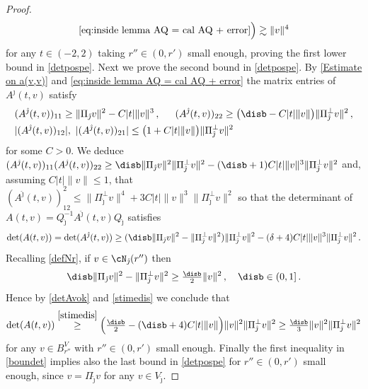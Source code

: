\documentclass[11pt,a4paper,reqno]{article}
\numberwithin{equation}{section}
\theoremstyle{definition}
\begin{document}
\begin{proof}
$${            \eqref{eq:inside lemma AQ = cal AQ + error}
            } \Big)   \gtrsim \|v\|^4 
        $$
     for any $ t \in (-2,2) $ taking $ r'' \in (0,r')$ small enough, proving the first lower bound in \eqref{detpospe}.  Next
     we prove the second bound in \eqref{detpospe}. 
    By \eqref{Estimate on a(v,v)}
    and 
    \eqref{eq:inside lemma AQ = cal AQ + error} the matrix entries of 
$ A^{\hat \jmath}(t,v) $ satisfy
\begin{equation}\label{boundet}
    \begin{aligned}
    &         (A^{\hat \jmath}(t,v))_{11}\geq \|\Pi_{\hat \jmath} v\|^2-C|t|\|v\|^3\, , \quad  \ \,  (A^{\hat \jmath}(t,v))_{22}\geq \big(\disb -C|t|\|v\|\big)\|\Pi_{\hat \jmath}^\bot v\|^2 \, , \\
    & 
| (A^{\hat \jmath}(t,v))_{12}| , \ 
|(A^{\hat \jmath}(t,v))_{21} | \leq  
            \big(1+C|t|\|v\|\big)\|\Pi_{\hat \jmath}^\bot v\|^2 
    \end{aligned}
   \end{equation}
   for some  $C>0$.
   We deduce
$    (A^{\hat \jmath}(t,v))_{11} (A^{\hat \jmath}(t,v))_{22} 
    \geq 
    \disb \|\Pi_{\hat \jmath} v\|^2\|\Pi_{\hat \jmath}^\bot v\|^2-(\disb+1)C|t|\|v\|^3\|\Pi_{\hat \jmath}^\bot v\|^2 $ 
    and, assuming $C|t|\|v\|\leq 1 $, that 
   $ (A^{\hat \jmath}(t,v))_{12}^2
        \leq \|\Pi_{\hat \jmath}^\bot v\|^4+3C|t|\|v\|^3\|\Pi_{\hat \jmath}^\bot v\|^2 $ 
so that  the determinant of 
        $ A(t,v) = 
        Q_{\hat \jmath}^{-1} A^{\hat \jmath}(t,v) Q_{\hat \jmath} 
        $ 
        satisfies 
 \begin{equation}\label{detAvok}
            \det(A(t,v))
             =\det(A^{\hat \jmath}(t,v))\geq (\disb \| \Pi_{\hat \jmath} v\|^2- \|\Pi_{\hat \jmath}^\bot v\|^2)\|\Pi_{\hat \jmath}^\bot v\|^2
            -(\delta+4)C|t|\|v\|^3\|\Pi_{\hat \jmath}^\bot v
            \|^2 \, .
            \end{equation}
    Recalling 
     \eqref{defNr},   
     if $v\in \cN_{\hat \jmath}(r'')$ then
    \begin{equation}\label{stimedis}
        \disb \|\Pi_{\hat \jmath} v\|^2- \|\Pi_{\hat \jmath}^\bot v\|^2\geq \tfrac \disb 2 \|v\|^2 \, , \quad \disb \in (0,1] \, .
     \end{equation}
        Hence by \eqref{detAvok} 
        and \eqref{stimedis} we conclude that 
        $$
            \det(A(t,v))
            \stackrel{ \eqref{stimedis}} \geq 
           \Big(\tfrac\disb 2-(\disb+4)C|t|\|v\|\Big)\|v\|^2\|\Pi_{\hat \jmath}^\bot v\|^2\geq \tfrac\disb3 \|v\|^2\|\Pi_{\hat \jmath}^\bot v\|^2
    $$
    for any  $ v \in B_{r''}^V $ with $ r'' \in (0,r')$ small enough.
    Finally the first inequality in \eqref{boundet} implies also
    the last bound in \eqref{detpospe} 
    for $r''\in (0,r')$ small enough,  since $ v = \Pi_{\hat \jmath} v  $
    for any $ v \in V_{\hat \jmath} $.
    \end{proof}
    
\end{document}
